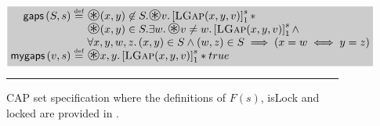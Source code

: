 \begin{figure}
\[\begin{array}{@{} l @{}}
		
		

	
	
	\shade{
	\begin{array}{@{} r @{\hspace*{3pt}} l @{}}
		\gapsCAP{S}{s} \eqdef & \iterStar(x, y) \not\in S. \iterStar v. \capGapC{x}{y}{v}{s} *\\
		& \iterStar (x, y) \in S. \exsts{w} \iterStar v \not= w. \capGapC{x}{y}{v}{s} \land \\
		&\for{x, y, w, z} (x, y) \in S \land (w, z) \in S \implies (x = w \iff y = z) \\
		
	  \myGapsCAP{v}{s} \eqdef & \iterStar x, y. \capGapC{x}{y}{v}{s} * true \\
		
	\end{array}
	}

		

\end{array}
\]
\hrule
\caption{CAP set specification where the definitions of $F(s)$, \textsf{isLock} and \textsf{locked} are provided in \cite{cap-ecoop10}.}
\label{fig:capSetExample}
\end{figure}